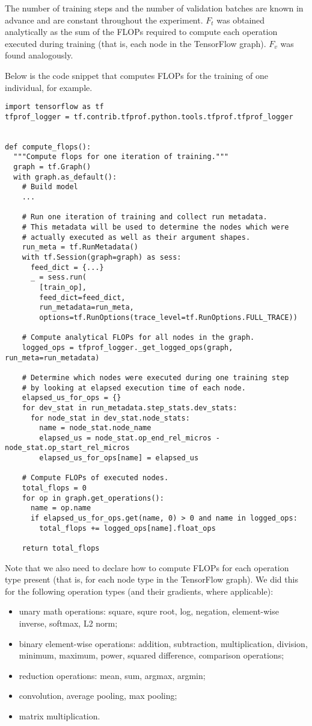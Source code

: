\documentclass{article}
\begin{document}
The number of training steps and the number of validation batches are known in advance and are constant throughout the experiment. $F_t$ was obtained analytically as the sum of the FLOPs required to compute each operation executed during training (that is, each node in the TensorFlow graph). $F_v$ was found analogously.

Below is the code snippet that computes FLOPs for the training of one individual, for example.
\smallskip
\begin{lstlisting}
import tensorflow as tf
tfprof_logger = tf.contrib.tfprof.python.tools.tfprof.tfprof_logger
 

def compute_flops():
  """Compute flops for one iteration of training."""
  graph = tf.Graph()
  with graph.as_default():
    # Build model
    ...

    # Run one iteration of training and collect run metadata.
    # This metadata will be used to determine the nodes which were
    # actually executed as well as their argument shapes.
    run_meta = tf.RunMetadata()
    with tf.Session(graph=graph) as sess:
      feed_dict = {...}
      _ = sess.run(
        [train_op],
        feed_dict=feed_dict,
        run_metadata=run_meta,
        options=tf.RunOptions(trace_level=tf.RunOptions.FULL_TRACE))
 
    # Compute analytical FLOPs for all nodes in the graph.
    logged_ops = tfprof_logger._get_logged_ops(graph, run_meta=run_metadata)
 
    # Determine which nodes were executed during one training step
    # by looking at elapsed execution time of each node.
    elapsed_us_for_ops = {}
    for dev_stat in run_metadata.step_stats.dev_stats:
      for node_stat in dev_stat.node_stats:
        name = node_stat.node_name
        elapsed_us = node_stat.op_end_rel_micros - node_stat.op_start_rel_micros
        elapsed_us_for_ops[name] = elapsed_us
 
    # Compute FLOPs of executed nodes.
    total_flops = 0
    for op in graph.get_operations():
      name = op.name
      if elapsed_us_for_ops.get(name, 0) > 0 and name in logged_ops:
        total_flops += logged_ops[name].float_ops
    
    return total_flops
\end{lstlisting}

Note that we also need to declare how to compute FLOPs for each operation type present (that is, for each node type in the TensorFlow graph). We did this for the following operation types (and their gradients, where applicable):
\begin{itemize}
    \item unary math operations: square, squre root, log, negation, element-wise inverse, softmax,
      L2 norm;
    \item binary element-wise operations: addition, subtraction, multiplication, division, minimum,
      maximum, power, squared difference, comparison operations;
    \item reduction operations: mean, sum, argmax, argmin;
    \item convolution, average pooling, max pooling;
    \item matrix multiplication.
\end{itemize}
\end{document}
